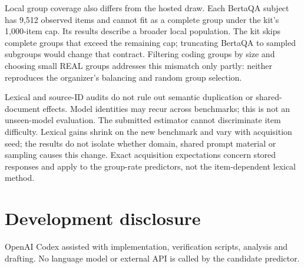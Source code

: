 \documentclass{article}
\begin{document}
Local group coverage also differs from the hosted draw. Each BertaQA subject has 9,512 observed items and cannot fit as a complete group under the kit's 1,000-item cap. Its results describe a broader local population. The kit skips complete groups that exceed the remaining cap; truncating BertaQA to sampled subgroups would change that contract. Filtering coding groups by size and choosing small REAL groups addresses this mismatch only partly: neither reproduces the organizer's balancing and random group selection.

Lexical and source-ID audits do not rule out semantic duplication or shared-document effects. Model identities may recur across benchmarks; this is not an unseen-model evaluation. The submitted estimator cannot discriminate item difficulty. Lexical gains shrink on the new benchmark and vary with acquisition seed; the results do not isolate whether domain, shared prompt material or sampling causes this change. Exact acquisition expectations concern stored responses and apply to the group-rate predictors, not the item-dependent lexical method.

\section*{Development disclosure}\label{development-disclosure}

OpenAI Codex assisted with implementation, verification scripts, analysis and drafting. No language model or external API is called by the candidate predictor.
\end{document}
